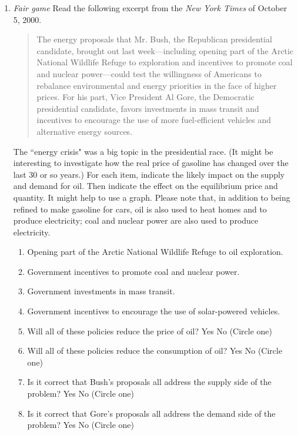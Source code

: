 \documentclass{article}
\begin{document}
\begin{enumerate}

\item \emph{Fair game} Read the following excerpt from the \emph{New York Times} of October 5, 2000. 

\begin{quote}
The energy proposals that Mr. Bush, the Republican presidential candidate, brought out last week---including opening part of the Arctic National Wildlife Refuge to exploration and incentives to promote coal and nuclear power---could test the willingness of Americans to rebalance environmental and energy priorities in the face of higher prices. For his part, Vice President Al Gore, the Democratic presidential candidate, favors investments in mass transit and incentives to encourage the use of more fuel-efficient vehicles and alternative energy sources.  
\end{quote}
%
The ``energy crisis" was a big topic in the presidential race. (It might be interesting to investigate how the real price of gasoline has changed over the last 30 or so years.) For each item, indicate the likely impact on the supply and demand for oil. Then indicate the effect on the equilibrium price and quantity. It might help to use a graph. Please note that, in addition to being refined to make gasoline for cars, oil is also used to heat homes and to produce electricity; coal and nuclear power are also used to produce electricity. 

	\begin{enumerate}
	\item Opening part of the Arctic National Wildlife Refuge to oil exploration.
	\item Government incentives to promote coal and nuclear power.
	\item Government investments in mass transit.
	\item Government incentives to encourage the use of solar-powered vehicles.
	\item Will all of these policies reduce the price of oil? Yes  No (Circle one)
	\item Will all of these policies reduce the consumption of oil? Yes  No (Circle one) 
	\item Is it correct that Bush's proposals all address the supply side of the problem? Yes  No (Circle one)
	\item Is it correct that Gore's proposals all address the demand side of the problem? Yes  No (Circle one)
	\end{enumerate}



\end{enumerate}
\end{document}
